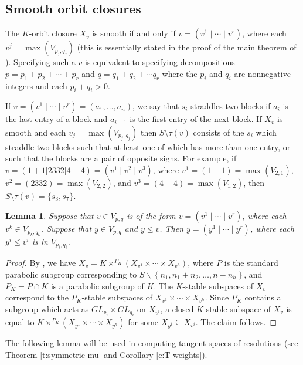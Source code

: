 \documentclass[11pt,letterpaper,reqno]{amsart}
\numberwithin{equation}{section}
\theoremstyle{plain}
\newtheorem{lemma}[theorem]{Lemma}
\theoremstyle{definition}
\theoremstyle{remark}
\begin{document}
\subsection{Smooth orbit closures} \label{ss:smooth}
The $K$-orbit closure $X_{v}$ is smooth if and only if 
$v = (v^1 \mid  \cdots \mid v^r)$, where each $v^j = \max(V_{p_j, q_j})$ (this is essentially stated in the proof of the main theorem of \cite{Mcg}).
Specifying such a $v$ is equivalent to specifying  decompositions $p = p_1 + p_2 + \cdots + p_r$ and $q = q_1 + q_2 + \cdots q_r$ where the
$p_i$ and $q_i$ are nonnegative integers and each $p_i+q_i>0$.

If $v =  (v^1 \mid  \cdots \mid v^r) = (a_1, \ldots, a_n)$, we say that $s_i$ straddles two blocks if $a_i$ is the last entry of a block and $a_{i+1}$
is the first entry of the next block.  If $X_v$ is smooth and each $v_j = \max(V_{p_j, q_j})$ then $S \setminus \tau(v)$ consists of
the $s_i$ which straddle two blocks such that at least one of which has more than one entry, or such that the blocks are a pair of opposite signs.
For example, if 
$v = (1+1| 2332| 4-4) = (v^1 \mid v^2 \mid  v^3)$, where $v^1= (1+1) = \max(V_{2,1})$, $v^2 = (2332) = \max(V_{2,2})$, and $v^3 =(4-4) =  \max(V_{1,2})$, then
$S \setminus \tau(v) = \{s_3, s_7 \}$.  


\begin{lemma} \label{l:concatenation}
Suppose that $v \in V_{p,q}$ is of the form $v = (v^1 \mid \cdots \mid v^r)$, where each $v^k \in V_{p_k, q_k}$.  Suppose that $y \in V_{p,q}$ and $y \leq v$.
Then $y = (y^1 \mid \cdots \mid y^r)$, where each $y^i\leq v^i$ is in $V_{p_i, q_i}$. 
\end{lemma}

\begin{proof}
By \cite[Proposition 4.3.1]{Lar}, we have \(X_v=K\times^{P_K}(X_{v^1}\times\cdots\times X_{v^h})\), where \(P\) is the standard parabolic subgroup corresponding to \(S\smallsetminus\left\{n_1,n_1+n_2,\ldots,n-n_h\right\}\), and \(P_K=P\cap K\) is a parabolic subgroup of \(K\).
The \(K\)-stable subspaces of \(X_v\) correspond to the \(P_K\)-stable subspaces of \(X_{v^1}\times\cdots\times X_{v^h}\).
Since \(P_K\) contains a subgroup which acts as \(GL_{p_i}\times GL_{q_i}\) on \(X_{v^i}\), a closed \(K\)-stable subspace of \(X_v\) is equal to \(K\times^{P_K}(X_{y^1}\times\cdots\times X_{y^h})\) for some \(X_{y^i}\subseteq X_{v^i}\).
The claim follows.
\end{proof}

The following lemma will be used in computing tangent spaces of resolutions 
(see Theorem \ref{t:symmetric-mu} and Corollary \ref{c:T-weights}).
\end{document}
